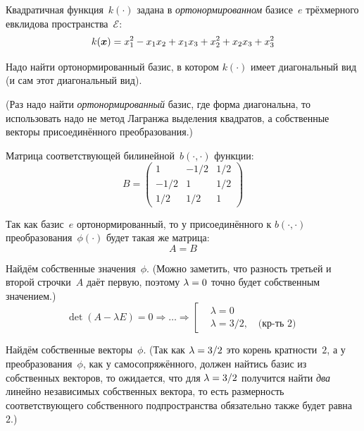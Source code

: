 \documentclass[a4paper,12pt]{article}
\theoremstyle{remark}
\begin{document}
  Квадратичная функция~$k(\cdot)$ задана в \emph{ортонормированном} базисе~$e$ трёхмерного евклидова пространства~$\mathcal E$:
  \[
    k(\boldsymbol x) = x_1^2 - x_1 x_2 + x_1 x_3 + x_2^2 + x_2 x_3 + x_3^2
  \]
  
  Надо найти ортонормированный базис, в котором $k(\cdot)$ имеет диагональный вид (и сам этот диагональный вид).
  
  \begin{solution}
    (Раз надо найти \emph{ортонормированный} базис, где форма диагональна, то использовать надо не метод Лагранжа выделения квадратов, а собственные векторы присоединённого преобразования.)
    
    Матрица соответствующей билинейной~$b(\cdot, \cdot)$ функции:
    \[
      B = \begin{pmatrix}
        1    & -1/2 & 1/2\\
        -1/2 & 1    & 1/2\\
        1/2  & 1/2  & 1
      \end{pmatrix}
    \]
    
    Так как базис~$e$ ортонормированный, то у присоединённого к $b(\cdot, \cdot)$ преобразования~$\phi(\cdot)$ будет такая же матрица:
    \[
      A = B
    \]
    
    Найдём собственные значения~$\phi$.
    (Можно заметить, что разность третьей и второй строчки~$A$ даёт первую, поэтому $\lambda \hm= 0$ точно будет собственным значением.)
    \[
      \det(A - \lambda E) = 0 \Rightarrow \ldots \Rightarrow \left[
        \begin{aligned}
          &\lambda = 0\\
          &\lambda = 3/2, \quad \mbox{(кр-ть 2)}
        \end{aligned}
      \right.
    \]
    
    Найдём собственные векторы~$\phi$.
    (Так как $\lambda \hm= 3/2$ это корень кратности~$2$, а у преобразования~$\phi$, как у самосопряжённого, должен найтись базис из собственных векторов, то ожидается, что для $\lambda \hm= 3/2$ получится найти \emph{два} линейно независимых собственных вектора, то есть размерность соответствующего собственного подпространства обязательно также будет равна~$2$.)
    

\end{solution}
\end{document}
